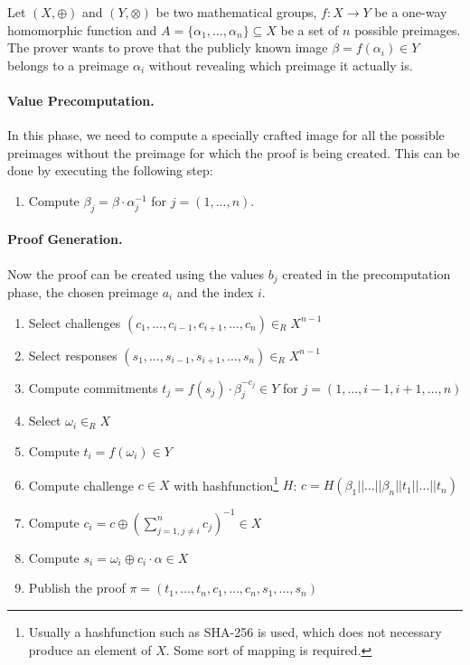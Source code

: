 \documentclass[numbers=noenddot, abstract=on, a4paper, headsepline,
footsepline, oneside, draft=off]{scrreprt}
\begin{document}
Let $(X,\oplus)$ and $(Y,\otimes)$ be two mathematical groups, $f:X \rightarrow
Y$ be a one-way homomorphic function and $A=\{\alpha_1,\ldots,\alpha_n\} \subseteq X$
be a set of $n$ possible preimages. The prover wants to prove that the publicly known
image $\beta=f(\alpha_i) \in Y$ belongs to a preimage $\alpha_i$ without
revealing which preimage it actually is. 

\paragraph{Value Precomputation.} In this phase, we need to compute a specially
crafted image for all the possible preimages without the preimage for which the
proof is being created. This can be done by executing the following step:

\begin{enumerate}
  \item Compute $\beta_j = \beta \cdot \alpha_j^{-1}$ for $j=(1,...,n)$.
\end{enumerate}
 
\paragraph{Proof Generation.} Now the proof can be created using the
values $b_j$ created in the precomputation phase, the chosen preimage $a_i$ and
the index $i$.
 
\begin{enumerate}  
  \item Select challenges $(c_1, \ldots, c_{i-1}, c_{i+1}, \ldots, c_n) \in_R
  X^{n-1}$
  \item Select responses $(s_1, \ldots, s_{i-1}, s_{i+1}, \ldots, s_n) \in_R
  X^{n-1}$
  \item Compute commitments $t_j=f(s_j) \cdot \beta_j^{-c_j} \in Y$ for
  $j=(1, \ldots, i-1, i+1, \ldots, n)$
  \item Select $\omega_i \in_R X$
  \item Compute $t_i=f(\omega_i) \in Y$
  \item Compute challenge $c\in X$ with hashfunction\footnote{Usually a
  hashfunction such as SHA-256 is used, which does not necessary produce an
  element of $X$. Some sort of mapping is required.} $H$:
  $c=H(\beta_1||\ldots||\beta_n||t_1||\ldots||t_n)$
  \item Compute $c_i=c\oplus(\sum_{j=1, j \neq i}^n c_j)^{-1} \in X$
  \item Compute $s_i=\omega_i \oplus c_i \cdot \alpha \in X$
  \item Publish the proof $\pi = (t_1,\ldots,t_n,c_1,\ldots,c_n,s_1,\ldots,s_n)$
\end{enumerate}
\end{document}
